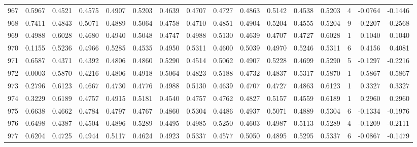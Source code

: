 \begin{tabular}{lrrrrrrrrrrrrrrr}
967 &      0.5967 &  0.4521 &  0.4575 &  0.4907 &  0.5203 &  0.4639 &  0.4707 &  0.4727 &  0.4863 &  0.5142 &   0.4538 &     0.5203 &      4 &                   -0.0764 &                    -0.1446 \\
968 &      0.7411 &  0.4843 &  0.5071 &  0.4889 &  0.5064 &  0.4758 &  0.4710 &  0.4851 &  0.4904 &  0.5204 &   0.4555 &     0.5204 &      9 &                   -0.2207 &                    -0.2568 \\
969 &      0.4988 &  0.6028 &  0.4680 &  0.4940 &  0.5048 &  0.4747 &  0.4988 &  0.5130 &  0.4639 &  0.4707 &   0.4727 &     0.6028 &      1 &                    0.1040 &                     0.1040 \\
970 &      0.1155 &  0.5236 &  0.4966 &  0.5285 &  0.4535 &  0.4950 &  0.5311 &  0.4600 &  0.5039 &  0.4970 &   0.5246 &     0.5311 &      6 &                    0.4156 &                     0.4081 \\
971 &      0.6587 &  0.4371 &  0.4392 &  0.4806 &  0.4860 &  0.5290 &  0.4514 &  0.5062 &  0.4907 &  0.5228 &   0.4699 &     0.5290 &      5 &                   -0.1297 &                    -0.2216 \\
972 &      0.0003 &  0.5870 &  0.4216 &  0.4806 &  0.4918 &  0.5064 &  0.4823 &  0.5188 &  0.4732 &  0.4837 &   0.5317 &     0.5870 &      1 &                    0.5867 &                     0.5867 \\
973 &      0.2796 &  0.6123 &  0.4667 &  0.4730 &  0.4776 &  0.4988 &  0.5130 &  0.4639 &  0.4707 &  0.4727 &   0.4863 &     0.6123 &      1 &                    0.3327 &                     0.3327 \\
974 &      0.3229 &  0.6189 &  0.4757 &  0.4915 &  0.5181 &  0.4540 &  0.4757 &  0.4762 &  0.4827 &  0.5157 &   0.4559 &     0.6189 &      1 &                    0.2960 &                     0.2960 \\
975 &      0.6638 &  0.4662 &  0.4784 &  0.4797 &  0.4767 &  0.4860 &  0.5304 &  0.4486 &  0.4937 &  0.5071 &   0.4889 &     0.5304 &      6 &                   -0.1334 &                    -0.1976 \\
976 &      0.6498 &  0.4387 &  0.4504 &  0.4896 &  0.5289 &  0.4495 &  0.4985 &  0.5250 &  0.4603 &  0.4987 &   0.5113 &     0.5289 &      4 &                   -0.1209 &                    -0.2111 \\
977 &      0.6204 &  0.4725 &  0.4944 &  0.5117 &  0.4624 &  0.4923 &  0.5337 &  0.4577 &  0.5050 &  0.4895 &   0.5295 &     0.5337 &      6 &                   -0.0867 &                    -0.1479 \\

\end{tabular}

